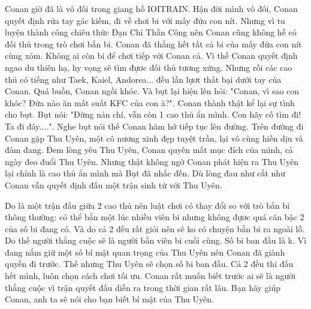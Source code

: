 Conan giờ đã là vô đối trong giang hồ IOITRAIN. Hận đời mình vô đối, Conan quyết định rửa tay gác kiếm, đi về chơi bi với mấy đứa con nít. Nhưng vì tu luyện thành công chiêu thức Đạn Chỉ Thần Công nên Conan cũng không hề có đối thủ trong trò chơi bắn bi. Conan đã thắng hết tất cả bi của mấy đứa con nít cùng xóm. Không ai còn bi để chơi tiếp với Conan cả. Vì thế Conan quyết định ngao du thiên hạ, hy vọng sẽ tìm đựơc đối thủ tương xứng. Nhưng rồi các cao thủ có tiếng như Taek, Kaiel, Andorea... đều lần lựơt thất bại dưới tay của Conan. Quá buồn, Conan ngồi khóc. Và bụt lại hiện lên hỏi: "Conan, vì sao con khóc? Đứa nào ăn mất suất KFC của con à?". Conan thành thật kể lại sự tình cho bụt. Bụt nói: "Đừng nản chí, vẫn còn 1 cao thủ ẩn mình. Con hãy cố tìm đi! Ta đi đây....". Nghe bụt nói thế Conan hăm hở tiếp tục lên đường. Trên đường đi Conan gặp Thu Uyên, một cô nương xinh đẹp tuyệt trần, lại vô cùng hiền dịu và đảm đang. Đem lòng yêu Thu Uyên, Conan quyên mất mục đích của mình, cả ngày đeo đuổi Thu Uyên. Nhưng thật không ngờ Conan phát hiện ra Thu Uyên lại chính là cao thủ ẩn mình mà Bụt đã nhắc đến. Dù lòng đau như cắt như Conan vẫn quyết định đấu một trận sinh tử với Thu Uyên.  

   Do là một trận đấu giữa 2 cao thủ nên luật chơi có thay đổi so với trò bắn bi thông thường: có thể bắn một lúc nhiều viên bi nhưng không đựơc quá căn bậc 2 của số bi đang có. Và do cả 2 đều rất giỏi nên sẽ ko có chuyện bắn bi ra ngoài lỗ. Do thế người thắng cuộc sẽ là người bắn viên bi cuối cùng. Số bi ban đầu là k. Vì đang nắm giữ một số bí mật quan trọng của Thu Uyên nên Conan đã giành quyền đi trước. Thế nhưng Thu Uyên sẽ chọn số bi ban đầu. Cả 2 đều thi đấu hết mình, luôn chọn cách chơi tối ưu. Conan rất muốn biết trước ai sẽ là người thắng cuộc vì trận quyết đấu diễn ra trong thời gian rất lâu. Bạn hãy giúp Conan, anh ta sẽ nói cho bạn biết bí mật của Thu Uyên.  

\
